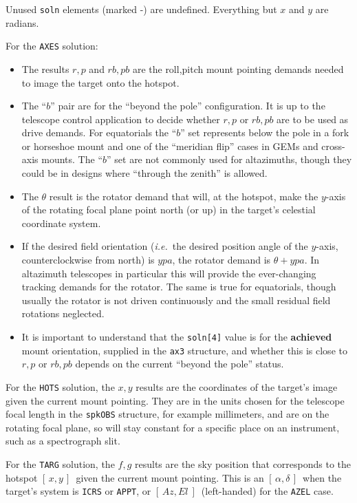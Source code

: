 \documentclass[11pt,fleqn,twoside,\paper]{article}
\renewcommand{\_}{{\tt\char'137}}     %
\newcommand{\radec}     {$[\,\alpha,\delta\,]$}
\newcommand{\azel}      {$[\,Az,El~]$}
\newcommand{\xy}        {$[\,x,y\,]$}
\begin{document}
{\begin{enumerate}
      Unused {\tt soln} elements (marked -) are undefined.  Everything
      but $x$ and $y$ are radians.

      For the {\tt AXES} solution:
      \begin{itemize}
      \item The results $r,p$ and $rb,pb$ are the roll,pitch mount
            pointing demands needed to image the target onto the
            hotspot.
      \item The ``$b$'' pair are for the ``beyond the pole''
            configuration.  It is up to the telescope control
            application to decide whether $r,p$ or $rb,pb$ are to be
            used as drive demands.  For equatorials the ``$b$'' set
            represents below the pole in a fork or horseshoe mount and
            one of the ``meridian flip'' cases in GEMs and cross-axis
            mounts.  The ``$b$'' set are not commonly used for
            altazimuths, though they could be in designs where ``through
            the zenith'' is allowed.
      \item The $\theta$ result is the rotator demand that will, at the
            hotspot, make the $y$-axis of the rotating focal plane point
            north (or up) in the target's celestial coordinate system.
      \item If the desired field orientation ({\it i.e.}~the desired
            position
            angle of the $y$-axis, counterclockwise from north) is
            $ypa$, the rotator demand is $\theta + ypa$.  In altazimuth
            telescopes in particular this will provide the
            ever-changing tracking
            demands for the rotator.  The same is true for equatorials,
            though usually the rotator is not driven continuously and
            the small residual field rotations neglected.
      \item It is important to understand that the {\tt soln[4]} value
            is for the {\bf achieved} mount orientation, supplied in the
            {\tt ax3} structure, and whether this is close to $r,p$ or
            $rb,pb$ depends on the current ``beyond the pole'' status.
      \end{itemize}

      For the {\tt HOTS} solution, the $x,y$ results are the
      coordinates of the target's image given the current mount
      pointing.  They are in the units chosen for the telescope focal
      length in the {\tt spkOBS} structure, for example millimeters,
      and are on the rotating focal plane, so will stay constant for a
      specific place on an instrument, such as a spectrograph slit.

      For the {\tt TARG} solution, the $f,g$ results are the sky
      position that corresponds to the hotspot \xy\ given the current
      mount pointing.  This is an \radec\ when the target's system is
      {\tt ICRS} or {\tt APPT}, or \azel\ (left-handed) for the
      {\tt AZEL} case.
\end{enumerate}
}
\label{end_spkVtel}
\end{document}
